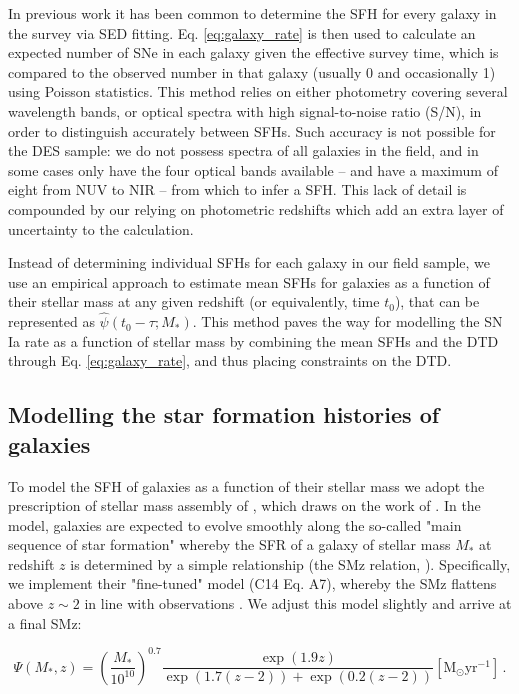 \documentclass[fleqn,usenatbib]{mnras}
\begin{document}
In previous work \citep[e.g.][]{Strolger2004,Maoz2012} it has been common to determine the SFH for every galaxy in the survey via SED fitting. Eq. \ref{eq:galaxy_rate} is then used to calculate an expected number of SNe in each galaxy given the effective survey time, which is compared to the observed number in that galaxy (usually 0 and occasionally 1) using Poisson statistics. This method relies on either photometry covering several wavelength bands, or optical spectra with high signal-to-noise ratio (S/N), in order to distinguish accurately between SFHs. Such accuracy is not possible for the DES sample: we do not possess spectra of all galaxies in the field, and in some cases only have the four optical bands available -- and have a maximum of eight from NUV to NIR -- from which to infer a SFH. This lack of detail is compounded by our relying on photometric redshifts which add an extra layer of uncertainty to the calculation. 

Instead of determining individual SFHs for each galaxy in our field sample, we use an empirical approach to estimate mean SFHs for galaxies as a function of their stellar mass at any given redshift (or equivalently, time $t_0$), that can be represented as $\hat \psi \left(t_0 -\tau; M_* \right)$. This method paves the way for modelling the SN Ia rate as a function of stellar mass by combining the mean SFHs and the DTD through Eq. \ref{eq:galaxy_rate}, and thus placing constraints on the DTD.

\subsection{Modelling the star formation histories of galaxies \label{subsec:method_sfh}}

To model the SFH of galaxies as a function of their stellar mass we adopt the prescription of stellar mass assembly of \citet{Childress2014}, which draws on the work of \citet{Zahid2012}. In the model, galaxies are expected to evolve smoothly along the so-called "main sequence of star formation" whereby the SFR of a galaxy of stellar mass $M_*$ at redshift $z$ is determined by a simple relationship (the SMz relation, \citealt{Zahid2012}). Specifically, we implement their "fine-tuned" model (C14 Eq. A7), whereby the SMz flattens above $z\sim2$ in line with observations \citep{Stark2013}. We adjust this model slightly and arrive at a final SMz:

\begin{equation}
    \Psi(M_*,z) = \left(\frac{M_*}{10^{10}}\right)^{0.7}\frac{\exp{\left(1.9z\right)}}{\exp{\left(1.7\left(z-2\right)\right)} + \exp{\left(0.2\left(z-2\right)\right)} } [\mathrm{M}_{\odot} \mathrm{yr}^{-1}]\,.
\end{equation}
\end{document}
